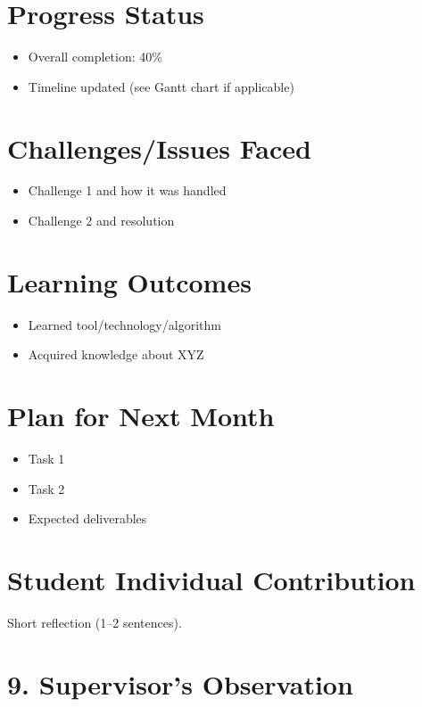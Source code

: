 \documentclass[12pt,a4paper]{article}
\begin{document}
\section{Progress Status}
\begin{itemize}[leftmargin=*]
    \item Overall completion: 40\%
    \item Timeline updated (see Gantt chart if applicable)
\end{itemize}

\section{Challenges/Issues Faced}
\begin{itemize}[leftmargin=*]
    \item Challenge 1 and how it was handled
    \item Challenge 2 and resolution
\end{itemize}

\section{Learning Outcomes}
\begin{itemize}[leftmargin=*]
    \item Learned tool/technology/algorithm
    \item Acquired knowledge about XYZ
\end{itemize}

\section{Plan for Next Month}
\begin{itemize}[leftmargin=*]
    \item Task 1
    \item Task 2
    \item Expected deliverables
\end{itemize}



\section{ Student Individual Contribution}
Short reflection (1–2 sentences).



\section*{9. Supervisor’s Observation}
\end{document}
